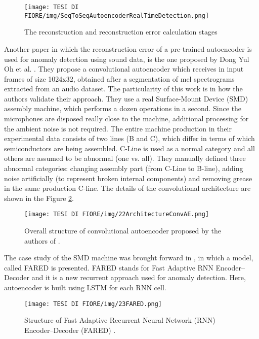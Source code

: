 \begin{figure}[ht]
\texttt{[image: TESI DI FIORE/img/SeqToSeqAutoencoderRealTimeDetection.png]}
\centering
\caption{The reconstruction and reconstruction error calculation stages \cite{13RealTimeDetectionUsingSequentialAutoencoder}}
\label{seq2seq-architecture-realtime}
\end{figure}

Another paper in which the reconstruction error of a pre-trained autoencoder is used for anomaly detection using sound data, is the one proposed by Dong Yul Oh et al. \cite{22SMDMachineResidualError}. They propose a convolutional autoencoder which receives in input frames of size 1024x32, obtained after a segmentation of mel spectrograms extracted from an audio dataset. The particularity of this work is in how the authors validate their approach. They use a real Surface-Mount Device (SMD) assembly machine, which performs a dozen operations in a second. Since the microphones are disposed really close to the machine, additional processing for the ambient noise is not required. The entire machine production in their experimental data consists of two lines (B and C), which differ in terms of which semiconductors are being assembled. C-Line is used as a normal category and all others are assumed to be abnormal (one vs. all). They manually defined three abnormal categories: changing assembly part (from C-Line to B-line), adding noise artificially (to represent broken internal components) and removing grease in the same production C-line. The details of the convolutional architecture are shown in the Figure \ref{22ConvAEArchitecture}.

\begin{figure}[ht]
\texttt{[image: TESI DI FIORE/img/22ArchitectureConvAE.png]}
\centering
\caption{Overall structure of convolutional autoencoder proposed by the authors of \cite{22SMDMachineResidualError}.}
\label{22ConvAEArchitecture}
\end{figure}

The case study of the SMD machine was brought forward in \cite{23SMDFared}, in which a model, called FARED is presented. FARED stands for Fast Adaptive RNN Encoder–Decoder and it is a new recurrent approach used for anomaly detection. Here, autoencoder is built using LSTM for each RNN cell.

\begin{figure}[ht]
\texttt{[image: TESI DI FIORE/img/23FARED.png]}
\centering
\caption{Structure of Fast Adaptive Recurrent Neural Network (RNN) Encoder–Decoder (FARED) \cite{23SMDFared}.}
\label{23FARED}
\end{figure}

